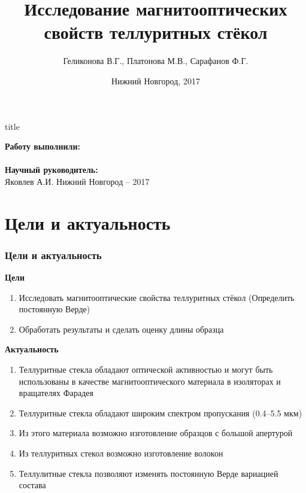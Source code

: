 \documentclass[10pt,pdf,hyperref={unicode}, dvipsnames, handout]{beamer}
\begin{document}
  

\title[Магнитооптическая активность теллуритных стёкол]{Исследование магнитооптических свойств теллуритных стёкол}
\author{%
	Геликонова В.Г., %
	Платонова М.В., %
	Сарафанов Ф.Г. %
}
\date{Нижний Новгород, 2017}

\begin{frame}[plain]
	\centering
	\vspace{2cm}
	\begin{beamercolorbox}[sep=8pt,center]{title}
		\bf{}\inserttitle
	\end{beamercolorbox}
	\vspace{0.5cm}
	\normalsize \textbf{Работу выполнили:}\\
	\large\insertauthor\\ 
	\vspace{0.5cm}
	\normalsize{\textbf{Научный руководитель:}\\}
	\large{Яковлев А.И.}
	\vfill
	\small{Нижний Новгород -- 2017}
\end{frame}
\section{Цели и актуальность}
\begin{frame}[t]
	\frametitle{Цели и актуальность}
	\textbf{Цели}\\
	\begin{enumerate}
		\item Исследовать магнитооптические свойства теллуритных стёкол (Определить постоянную Верде)
		\item Обработать результаты и сделать оценку длины образца
	\end{enumerate}
	\textbf{Актуальность}\\
	\begin{enumerate}
		\item Теллуритные стекла обладают оптической активностью и могут быть использованы в качестве магнитооптического материала в изоляторах и вращателях Фарадея
		\item Теллуритные стекла обладают широким спектром пропускания (0.4--5.5  мкм) %
		\item Из этого материала возможно изготовление образцов с большой апертурой
		\item Из теллуритных стекол возможно изготовление волокон
		\item Теллулитные стекла позволяют изменять постоянную Верде вариацией состава
	\end{enumerate}
\end{frame}
\end{document}
